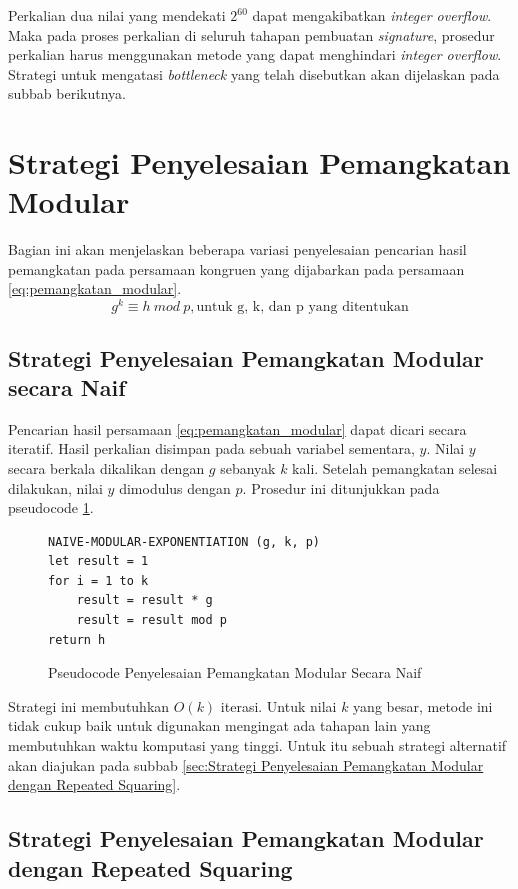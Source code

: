 Perkalian dua nilai yang mendekati $2^{60}$ dapat mengakibatkan \textit{integer overflow}. Maka pada proses perkalian di seluruh tahapan pembuatan \textit{signature}, prosedur perkalian harus menggunakan metode yang dapat menghindari \textit{integer overflow}. Strategi untuk mengatasi \textit{bottleneck} yang telah disebutkan akan dijelaskan pada subbab berikutnya.

\section{Strategi Penyelesaian Pemangkatan Modular}
Bagian ini akan menjelaskan beberapa variasi penyelesaian pencarian hasil pemangkatan pada persamaan kongruen yang dijabarkan pada persamaan \eqref{eq:pemangkatan_modular}.
\begin{equation}
g^k \equiv h\ mod\ p,\text{untuk g, k, dan p yang ditentukan}
\label{eq:pemangkatan_modular}
\end{equation}

\subsection{Strategi Penyelesaian Pemangkatan Modular secara Naif}
Pencarian hasil persamaan \eqref{eq:pemangkatan_modular} dapat dicari secara iteratif. Hasil perkalian disimpan pada sebuah variabel sementara, $y$. Nilai $y$ secara berkala dikalikan dengan $g$ sebanyak $k$ kali. Setelah pemangkatan selesai dilakukan, nilai $y$ dimodulus dengan $p$. Prosedur ini ditunjukkan pada pseudocode \ref{psdo:modex_naive}.

\begin{figure}
\begin{lstlisting}[firstnumber=0]
NAIVE-MODULAR-EXPONENTIATION (g, k, p)
let result = 1
for i = 1 to k
	result = result * g
	result = result mod p
return h
\end{lstlisting}
\caption{Pseudocode Penyelesaian Pemangkatan Modular Secara Naif}
\label{psdo:modex_naive}
\end{figure}

Strategi ini membutuhkan $O(k)$ iterasi. Untuk nilai $k$ yang besar, metode ini tidak cukup baik untuk digunakan mengingat ada tahapan lain yang membutuhkan waktu komputasi yang tinggi. Untuk itu sebuah strategi alternatif akan diajukan pada subbab \ref{sec:Strategi Penyelesaian Pemangkatan Modular dengan Repeated Squaring}.

\subsection{Strategi Penyelesaian Pemangkatan Modular dengan Repeated Squaring}

